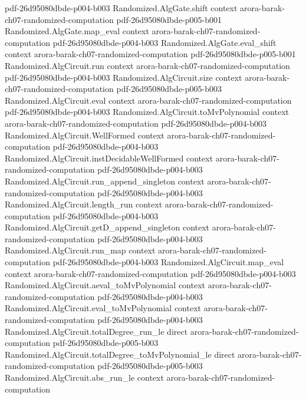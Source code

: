 \begin{theorem}
  {pdf-26d95080dbde-p004-b003}
\proofstep
  {Randomized.AlgGate.shift}
  {context}
  {arora-barak-ch07-randomized-computation}
  {pdf-26d95080dbde-p005-b001}
\proofstep
  {Randomized.AlgGate.map_eval}
  {context}
  {arora-barak-ch07-randomized-computation}
  {pdf-26d95080dbde-p004-b003}
\proofstep
  {Randomized.AlgGate.eval_shift}
  {context}
  {arora-barak-ch07-randomized-computation}
  {pdf-26d95080dbde-p005-b001}
\proofstep
  {Randomized.AlgCircuit.run}
  {context}
  {arora-barak-ch07-randomized-computation}
  {pdf-26d95080dbde-p004-b003}
\proofstep
  {Randomized.AlgCircuit.size}
  {context}
  {arora-barak-ch07-randomized-computation}
  {pdf-26d95080dbde-p005-b003}
\proofstep
  {Randomized.AlgCircuit.eval}
  {context}
  {arora-barak-ch07-randomized-computation}
  {pdf-26d95080dbde-p004-b003}
\proofstep
  {Randomized.AlgCircuit.toMvPolynomial}
  {context}
  {arora-barak-ch07-randomized-computation}
  {pdf-26d95080dbde-p004-b003}
\proofstep
  {Randomized.AlgCircuit.WellFormed}
  {context}
  {arora-barak-ch07-randomized-computation}
  {pdf-26d95080dbde-p004-b003}
\proofstep
  {Randomized.AlgCircuit.instDecidableWellFormed}
  {context}
  {arora-barak-ch07-randomized-computation}
  {pdf-26d95080dbde-p004-b003}
\proofstep
  {Randomized.AlgCircuit.run_append_singleton}
  {context}
  {arora-barak-ch07-randomized-computation}
  {pdf-26d95080dbde-p004-b003}
\proofstep
  {Randomized.AlgCircuit.length_run}
  {context}
  {arora-barak-ch07-randomized-computation}
  {pdf-26d95080dbde-p004-b003}
\proofstep
  {Randomized.AlgCircuit.getD_append_singleton}
  {context}
  {arora-barak-ch07-randomized-computation}
  {pdf-26d95080dbde-p004-b003}
\proofstep
  {Randomized.AlgCircuit.run_map}
  {context}
  {arora-barak-ch07-randomized-computation}
  {pdf-26d95080dbde-p004-b003}
\proofstep
  {Randomized.AlgCircuit.map_eval}
  {context}
  {arora-barak-ch07-randomized-computation}
  {pdf-26d95080dbde-p004-b003}
\proofstep
  {Randomized.AlgCircuit.aeval_toMvPolynomial}
  {context}
  {arora-barak-ch07-randomized-computation}
  {pdf-26d95080dbde-p004-b003}
\proofstep
  {Randomized.AlgCircuit.eval_toMvPolynomial}
  {context}
  {arora-barak-ch07-randomized-computation}
  {pdf-26d95080dbde-p004-b003}
\proofstep
  {Randomized.AlgCircuit.totalDegree_run_le}
  {direct}
  {arora-barak-ch07-randomized-computation}
  {pdf-26d95080dbde-p005-b003}
\proofstep
  {Randomized.AlgCircuit.totalDegree_toMvPolynomial_le}
  {direct}
  {arora-barak-ch07-randomized-computation}
  {pdf-26d95080dbde-p005-b003}
\proofstep
  {Randomized.AlgCircuit.abs_run_le}
  {context}
  {arora-barak-ch07-randomized-computation}

\end{theorem}
